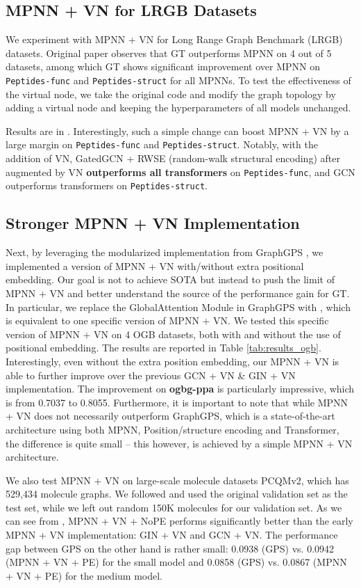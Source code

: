 \documentclass[nohyperref]{article}
\theoremstyle{plain}
\theoremstyle{definition}
\theoremstyle{remark}
\newcommand{\DS}{\text{DeepSets}}
\newcommand{\pepfunc}{\texttt{Peptides-func}\xspace}
\newcommand{\pepstruct}{\texttt{Peptides-struct}\xspace}
\begin{document}
\subsection{MPNN + VN for LRGB Datasets}
\label{subsec:lrgb}
We experiment with MPNN + VN for Long Range Graph Benchmark (LRGB) datasets. Original paper \citep{dwivedi2022long} observes that GT outperforms MPNN on 4 out of 5 datasets, among which GT shows significant improvement over MPNN on \pepfunc and \pepstruct for all MPNNs. To test the effectiveness of the virtual node, we take the original code and modify the graph topology by adding a virtual node and keeping the hyperparameters of all models unchanged. 

Results are in . Interestingly, such a simple change can boost MPNN + VN by a large margin on \pepfunc and \pepstruct. Notably, with the addition of VN, GatedGCN + RWSE (random-walk structural encoding) after augmented by VN {\bf outperforms all transformers} on \pepfunc, and GCN outperforms transformers on \pepstruct. 

\subsection{Stronger MPNN + VN Implementation}
\label{subsec:ogb}
Next, by leveraging the modularized implementation from GraphGPS \citep{rampavsek2022recipe}, we implemented a version of MPNN + VN with/without extra positional embedding. Our goal is not to achieve SOTA but instead to push the limit of MPNN + VN and better understand the source of the performance gain for GT. 
In particular, we replace the GlobalAttention Module in GraphGPS with \DS{}, which is equivalent to one specific version of MPNN + VN. We tested this specific version of MPNN + VN on 4 OGB datasets, both with and without the use of positional embedding. The results are reported in Table \ref{tab:results_ogb}. Interestingly, even without the extra position embedding, our MPNN + VN is able to further improve over the previous GCN + VN \& GIN + VN implementation. 
The improvement on \textbf{ogbg-ppa} is particularly impressive, which is from 0.7037 to 0.8055. 
Furthermore, it is important to note that while MPNN + VN does not necessarily outperform GraphGPS, which is a state-of-the-art architecture using both MPNN, Position/structure encoding and Transformer, the difference is quite small -- this however, is achieved by a simple MPNN + VN architecture. 

We also test MPNN + VN on large-scale molecule datasets PCQMv2, which has 529,434 molecule graphs. 
We followed \citep{rampavsek2022recipe}
and used the original validation set as the test set, while we left out random 150K molecules for our validation set. 
As we can see from , MPNN + VN + NoPE performs significantly better than the early MPNN + VN implementation: GIN + VN and GCN + VN. 
The performance gap between GPS on the other hand is rather small: 0.0938 (GPS) vs. 0.0942 (MPNN + VN + PE) for the small model and 0.0858 (GPS) vs. 0.0867 (MPNN + VN + PE) for the medium model. 
\end{document}
